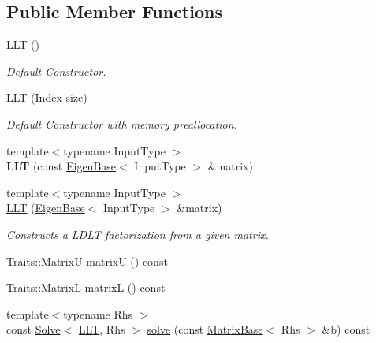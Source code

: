\subsection*{Public Member Functions}
\begin{DoxyCompactItemize}
\item 
\mbox{\hyperlink{class_eigen_1_1_l_l_t_a16d1ec9ea6497ba1febb242c2e8a7a96}{L\+LT}} ()
\begin{DoxyCompactList}\small\item\em Default Constructor. \end{DoxyCompactList}\item 
\mbox{\hyperlink{class_eigen_1_1_l_l_t_ab3656cfbdf38e03c57d5cf79bf8131b6}{L\+LT}} (\mbox{\hyperlink{class_eigen_1_1_l_l_t_ac7a64274814fa76e8b1e9e945546037f}{Index}} size)
\begin{DoxyCompactList}\small\item\em Default Constructor with memory preallocation. \end{DoxyCompactList}\item 
\mbox{\label{class_eigen_1_1_l_l_t_a0f9ef009097996bbf4287024a1f05836}} 
{\footnotesize template$<$typename Input\+Type $>$ }\\{\bfseries L\+LT} (const \mbox{\hyperlink{struct_eigen_1_1_eigen_base}{Eigen\+Base}}$<$ Input\+Type $>$ \&matrix)
\item 
{\footnotesize template$<$typename Input\+Type $>$ }\\\mbox{\hyperlink{class_eigen_1_1_l_l_t_a1848a00addade9a0f7f70493c52ecc9d}{L\+LT}} (\mbox{\hyperlink{struct_eigen_1_1_eigen_base}{Eigen\+Base}}$<$ Input\+Type $>$ \&matrix)
\begin{DoxyCompactList}\small\item\em Constructs a \mbox{\hyperlink{class_eigen_1_1_l_d_l_t}{L\+D\+LT}} factorization from a given matrix. \end{DoxyCompactList}\item 
Traits\+::\+MatrixU \mbox{\hyperlink{class_eigen_1_1_l_l_t_a18a390f085567e650e8345cc7e7c0df8}{matrixU}} () const
\item 
Traits\+::\+MatrixL \mbox{\hyperlink{class_eigen_1_1_l_l_t_a7f4a3eedbf82e7ce2d6bf0dcd84cdfa3}{matrixL}} () const
\item 
{\footnotesize template$<$typename Rhs $>$ }\\const \mbox{\hyperlink{class_eigen_1_1_solve}{Solve}}$<$ \mbox{\hyperlink{class_eigen_1_1_l_l_t}{L\+LT}}, Rhs $>$ \mbox{\hyperlink{class_eigen_1_1_l_l_t_a3738bb3ce6f9b837a2beb432b937499f}{solve}} (const \mbox{\hyperlink{class_eigen_1_1_matrix_base}{Matrix\+Base}}$<$ Rhs $>$ \&b) const

\end{DoxyCompactItemize}
